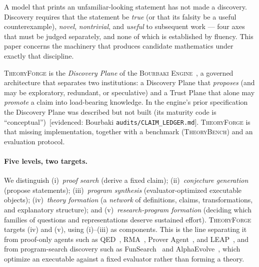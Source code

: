 \documentclass[11pt]{amsart}
\theoremstyle{definition}
\theoremstyle{remark}
\newcommand{\engine}{\textsc{Bourbaki Engine}}
\newcommand{\tf}{\textsc{TheoryForge}}
\newcommand{\tb}{\textsc{TheoryBench}}
\newcommand{\ev}[1]{\textsf{\footnotesize[#1]}} %
\begin{document}
A model that prints an unfamiliar-looking statement has not made a discovery.
Discovery requires that the statement be \emph{true} (or that its falsity be a
useful counterexample), \emph{novel}, \emph{nontrivial}, and \emph{useful} to
subsequent work --- four axes that must be judged separately, and none of which
is established by fluency. This paper concerns the machinery that produces
candidate mathematics under exactly that discipline.

\tf{} is the \emph{Discovery Plane} of the \engine{}~\cite{lucius2026engine}, a
governed architecture that separates two institutions: a Discovery Plane that
\emph{proposes} (and may be exploratory, redundant, or speculative) and a Trust
Plane that alone may \emph{promote} a claim into load-bearing knowledge. In the
engine's prior specification the Discovery Plane was described but not built (its
maturity code is ``conceptual'')~\ev{evidenced: Bourbaki \texttt{audits/CLAIM\_LEDGER.md}}.
\tf{} is that missing implementation, together with a benchmark (\tb{}) and an
evaluation protocol.

\paragraph{Five levels, two targets.} We distinguish
(i)~\emph{proof search} (derive a fixed claim);
(ii)~\emph{conjecture generation} (propose statements);
(iii)~\emph{program synthesis} (evaluator-optimized executable objects);
(iv)~\emph{theory formation} (a \emph{network} of definitions, claims,
transformations, and explanatory structure); and
(v)~\emph{research-program formation} (deciding which families of questions and
representations deserve sustained effort). \tf{} targets (iv) and (v), using
(i)--(iii) as components. This is the line separating it from proof-only agents
such as QED~\cite{QED26}, RMA~\cite{RMA26}, Prover Agent~\cite{ProverAgent25},
and LEAP~\cite{LEAP26}, and from program-search discovery such as
FunSearch~\cite{RomeraParedes24} and AlphaEvolve~\cite{AlphaEvolve25}, which
optimize an executable against a fixed evaluator rather than forming a theory.
\end{document}
